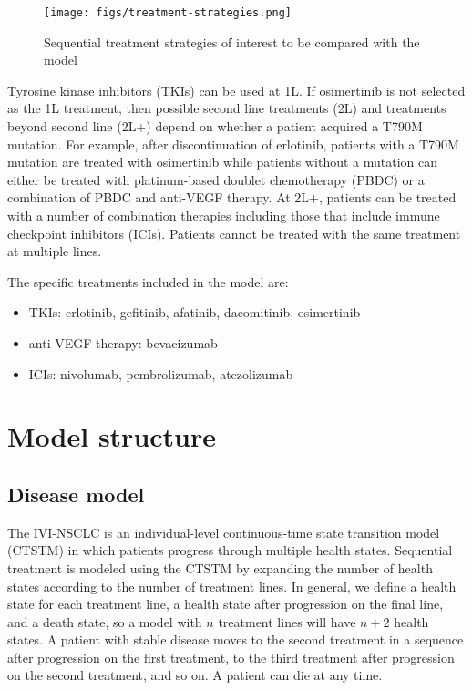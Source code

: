 \documentclass[11pt,final,fleqn]{article}\usepackage[]{graphicx}\usepackage[]{color}
\theoremstyle{plain}
\begin{document}
{\begin{figure}[h]
\centering
\texttt{[image: figs/treatment-strategies.png]} 
\caption{Sequential treatment strategies of interest to be compared with the model}\label{fig:treatment-strategies}
\end{figure}

Tyrosine kinase inhibitors (TKIs) can be used at 1L. If osimertinib is not selected as the 1L treatment, then possible second line treatments (2L) and treatments beyond second line (2L+) depend on whether a patient acquired a T790M mutation. For example, after discontinuation of erlotinib, patients with a T790M mutation are treated with osimertinib while patients without a mutation can either be treated with platinum-based doublet chemotherapy (PBDC) or a combination of PBDC and anti-VEGF therapy. At 2L+, patients can be treated with a number of combination therapies including those that include immune checkpoint inhibitors (ICIs). Patients cannot be treated with the same treatment at multiple lines. 

The specific treatments included in the model are:

\begin{itemize}
\item TKIs: erlotinib, gefitinib, afatinib, dacomitinib, osimertinib
\item anti-VEGF therapy: bevacizumab
\item ICIs: nivolumab, pembrolizumab, atezolizumab

\end{itemize} 

\section{Model structure}\label{sec:model-structure}
\subsection{Disease model}
The IVI-NSCLC is an individual-level continuous-time state transition model (CTSTM) in which patients progress through multiple health states. Sequential treatment is modeled using the CTSTM by expanding the number of health states according to the number of treatment lines. In general, we define a health state for each treatment line, a health state after progression on the final line, and a death state, so a model with $n$ treatment lines will have $n+2$ health states. A patient with stable disease moves to the second treatment in a sequence after progression on the first treatment, to the third treatment after progression on the second treatment, and so on. A patient can die at any time. 

}
\end{document}
